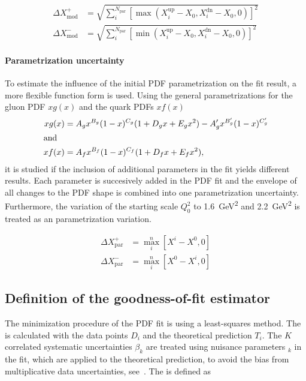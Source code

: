 \begin{align*}
  \Delta X^+_{\mathrm{mod}} &= \sqrt{\sum_i^{N_{\mathrm{par}}} \left[ \max(X_i^{\mathrm{up}}
    -X_0, X_i^{\mathrm{dn}} - X_0, 0)\right]^2}\\
    \Delta X^-_{\mathrm{mod}} &= \sqrt{\sum_i^{N_{\mathrm{par}}} \left[ \min(X_i^{\mathrm{up}} - X_0, X_i^{\mathrm{dn}} - X_0,0)\right]^2}
\end{align*}

\paragraph{Parametrization uncertainty}

To estimate the influence of the initial PDF parametrization on the fit result, a
more flexible function form is used. Using the general
parametrizations for the gluon PDF $xg(x)$ and the quark PDFs $xf(x)$
%
\begin{align*}
   xg(x) &= A_g x^{B_g} (1-x)^{C_g} (1  + D_g x + E_g x^2) - A'_g x^{B'_g} (1-x)^{C'_g}\\
\intertext{and}
   xf(x) &= A_{f}  x^{B_{f}} (1-x)^{C_{f}} (1 + D_{f}x + E_{f}x^2),
\end{align*}
%
it is studied if the inclusion of additional parameters in the fit yields
different results. Each parameter is succesively added in the PDF fit and the
envelope of all changes to the PDF shape is combined into one parametrization
uncertainty. Furthermore, the variation of the starting scale $Q_0^2$ to
\SI{1.6}{\GeV\squared} and \SI{2.2}{\GeV\squared} is treated as an 
parametrization variation.

\begin{align*}
  \Delta X^+_{\mathrm{par}} &= \max_{i}^{n} \left[ X^i - X^0, 0 \right]\\
  \Delta X^-_{\mathrm{par}} &= \max_{i}^{n} \left[ X^0 - X^i, 0 \right]
\end{align*}


\subsection{Definition of the goodness-of-fit estimator}
\label{sec:chi2_definition}

The minimization procedure of the PDF fit is using a least-squares method. The \chisq is
calculated with the data points $D_i$ and the theoretical prediction $T_i$. The
$K$  correlated systematic uncertainties $\beta_{k}$ are treated using nuisance parameters
$_k$ in the fit, which are applied to the theoretical prediction, to avoid the bias from
multiplicative data uncertainties, see~\cite{Lyons:1989gh}. The \chisq is
defined as

